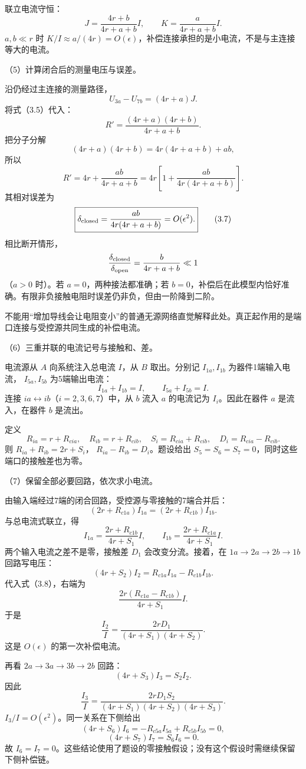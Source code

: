 \documentclass[12pt,a4paper,fontset=fandol]{ctexart}
\begin{document}
联立电流守恒： \[
\boxed{J=\frac{4r+b}{4r+a+b}I,\qquad
K=\frac{a}{4r+a+b}I.}\tag{3.5}
\] \(a,b\ll r\) 时
\(K/I\approx a/(4r)=O(\epsilon)\)，补偿连接承担的是小电流，不是与主连接等大的电流。

（5）计算闭合后的测量电压与误差。

沿仍经过主连接的测量路径， \[
U_{3a}-U_{7b}=(4r+a)J.
\] 将式（3.5）代入： \[
R'=\frac{(4r+a)(4r+b)}{4r+a+b}.
\] 把分子分解 \[
(4r+a)(4r+b)=4r(4r+a+b)+ab,
\] 所以 \[
\boxed{R'=4r+\frac{ab}{4r+a+b}
=4r\left[1+\frac{ab}{4r(4r+a+b)}\right].}\tag{3.6}
\] 其相对误差为 \[
\boxed{\delta_{\rm closed}
=\frac{ab}{4r(4r+a+b)}=O(\epsilon^2).}\tag{3.7}
\] 相比断开情形， \[
\frac{\delta_{\rm closed}}{\delta_{\rm open}}
=\frac{b}{4r+a+b}\ll1
\] （\(a>0\) 时）。若 \(a=0\)，两种接法都准确；若
\(b=0\)，补偿后在此模型内恰好准确。有限非负接触电阻时误差仍非负，但由一阶降到二阶。

不能用``增加导线会让电阻变小''的普通无源网络直觉解释此处。真正起作用的是端口连接与受控源共同生成的补偿电流。

（6）三重并联的电流记号与接触和、差。

电流源从 \(A\) 向系统注入总电流 \(I\)，从 \(B\) 取出。分别记
\(I_{1a},I_{1b}\) 为器件1端输入电流， \(I_{5a},I_{5b}\) 为5端输出电流：
\[
I_{1a}+I_{1b}=I,\qquad
I_{5a}+I_{5b}=I.
\] 连接 \(ia\leftrightarrow ib\)（\(i=2,3,6,7\)）中，从 \(b\) 流入 \(a\)
的电流记为 \(I_i\)。因此在器件 \(a\) 是流入，在器件 \(b\) 是流出。

定义 \[
R_{ia}=r+R_{cia},\quad R_{ib}=r+R_{cib},\quad
S_i=R_{cia}+R_{cib},\quad D_i=R_{cia}-R_{cib}.
\] 则 \(R_{ia}+R_{ib}=2r+S_i\)， \(R_{ia}-R_{ib}=D_i\)。题设给出
\(S_5=S_6=S_7=0\)，同时这些端口的接触差也为零。

（7）保留全部必要回路，依次求小电流。

由输入端经过7端的闭合回路，受控源与零接触的7端合并后： \[
(2r+R_{c1a})I_{1a}
=(2r+R_{c1b})I_{1b}.
\] 与总电流式联立，得 \[
\boxed{
I_{1a}=\frac{2r+R_{c1b}}{4r+S_1}I,\qquad
I_{1b}=\frac{2r+R_{c1a}}{4r+S_1}I.}\tag{3.8}
\] 两个输入电流之差不是零，接触差 \(D_1\) 会改变分流。接着，在
\(1a\to2a\to2b\to1b\) 回路写电压： \[
(4r+S_2)I_2=R_{c1a}I_{1a}-R_{c1b}I_{1b}.
\] 代入式（3.8），右端为 \[
\frac{2r(R_{c1a}-R_{c1b})}{4r+S_1}I.
\] 于是 \[
\boxed{\frac{I_2}{I}
=\frac{2rD_1}{(4r+S_1)(4r+S_2)}.}\tag{3.9}
\] 这是 \(O(\epsilon)\) 的第一次补偿电流。

再看 \(2a\to3a\to3b\to2b\) 回路： \[
(4r+S_3)I_3=S_2I_2.
\] 因此 \[
\boxed{\frac{I_3}{I}
=\frac{2rD_1S_2}
{(4r+S_1)(4r+S_2)(4r+S_3)}.}\tag{3.10}
\] \(I_3/I=O(\epsilon^2)\)。同一关系在下侧给出 \[
(4r+S_6)I_6=-R_{c5a}I_{5a}+R_{c5b}I_{5b}=0,
\] \[
(4r+S_7)I_7=S_6I_6=0.
\] 故
\(I_6=I_7=0\)。这些结论使用了题设的零接触假设；没有这个假设时需继续保留下侧补偿链。
\end{document}
